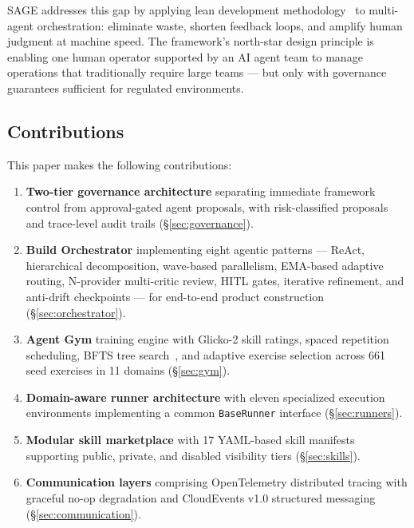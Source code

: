 \documentclass[11pt,a4paper]{article}
\begin{document}
SAGE addresses this gap by applying lean development methodology~\citep{poppendieck2003lean} to multi-agent orchestration: eliminate waste, shorten feedback loops, and amplify human judgment at machine speed. The framework's north-star design principle is enabling one human operator supported by an AI agent team to manage operations that traditionally require large teams --- but only with governance guarantees sufficient for regulated environments.

\subsection{Contributions}

This paper makes the following contributions:

\begin{enumerate}[noitemsep]
    \item \textbf{Two-tier governance architecture} separating immediate framework control from approval-gated agent proposals, with risk-classified proposals and trace-level audit trails (\S\ref{sec:governance}).

    \item \textbf{Build Orchestrator} implementing eight agentic patterns --- ReAct, hierarchical decomposition, wave-based parallelism, EMA-based adaptive routing, N-provider multi-critic review, HITL gates, iterative refinement, and anti-drift checkpoints --- for end-to-end product construction (\S\ref{sec:orchestrator}).

    \item \textbf{Agent Gym} training engine with Glicko-2 skill ratings, spaced repetition scheduling, BFTS tree search~\citep{aiscientistv2}, and adaptive exercise selection across 661 seed exercises in 11 domains (\S\ref{sec:gym}).

    \item \textbf{Domain-aware runner architecture} with eleven specialized execution environments implementing a common \texttt{BaseRunner} interface (\S\ref{sec:runners}).

    \item \textbf{Modular skill marketplace} with 17 YAML-based skill manifests supporting public, private, and disabled visibility tiers (\S\ref{sec:skills}).

    \item \textbf{Communication layers} comprising OpenTelemetry distributed tracing with graceful no-op degradation and CloudEvents v1.0 structured messaging (\S\ref{sec:communication}).


\end{enumerate}
\end{document}
